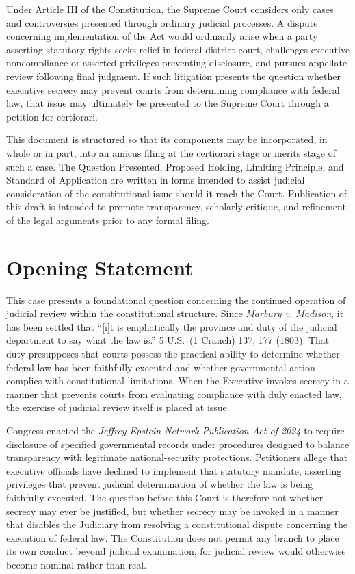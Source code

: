 \documentclass[12pt]{article}
\begin{document}
Under Article III of the Constitution, the Supreme Court considers only cases and controversies presented through ordinary judicial processes.
A dispute concerning implementation of the Act would ordinarily arise when a party asserting statutory rights seeks relief in federal district court, challenges executive noncompliance or asserted privileges preventing disclosure, and pursues appellate review following final judgment.
If such litigation presents the question whether executive secrecy may prevent courts from determining compliance with federal law, that issue may ultimately be presented to the Supreme Court through a petition for certiorari.

This document is structured so that its components may be incorporated, in whole or in part, into an amicus filing at the certiorari stage or merits stage of such a case.
The Question Presented, Proposed Holding, Limiting Principle, and Standard of Application are written in forms intended to assist judicial consideration of the constitutional issue should it reach the Court.
Publication of this draft is intended to promote transparency, scholarly critique, and refinement of the legal arguments prior to any formal filing.

\section*{Opening Statement}

This case presents a foundational question concerning the continued operation of judicial review within the constitutional structure.
Since \emph{Marbury v. Madison}, it has been settled that “[i]t is emphatically the province and duty of the judicial department to say what the law is.” 5 U.S.\ (1 Cranch) 137, 177 (1803).
That duty presupposes that courts possess the practical ability to determine whether federal law has been faithfully executed and whether governmental action complies with constitutional limitations.
When the Executive invokes secrecy in a manner that prevents courts from evaluating compliance with duly enacted law, the exercise of judicial review itself is placed at issue.

Congress enacted the \emph{Jeffrey Epstein Network Publication Act of 2024} to require disclosure of specified governmental records under procedures designed to balance transparency with legitimate national-security protections.
Petitioners allege that executive officials have declined to implement that statutory mandate, asserting privileges that prevent judicial determination of whether the law is being faithfully executed.
The question before this Court is therefore not whether secrecy may ever be justified, but whether secrecy may be invoked in a manner that disables the Judiciary from resolving a constitutional dispute concerning the execution of federal law.
The Constitution does not permit any branch to place its own conduct beyond judicial examination, for judicial review would otherwise become nominal rather than real.
\end{document}
